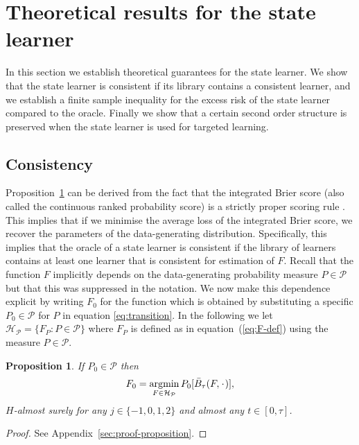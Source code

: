 \documentclass[numsec,webpdf,contemporary,medium,namedate]{oup-authoring-template}%
\theoremstyle{thmstyleone}%
\newtheorem{proposition}{Proposition}
\theoremstyle{thmstyletwo}%
\theoremstyle{thmstylethree}%
\DeclareMathOperator{\E}{\mathbb{E}} %
\newcommand{\blank}{\makebox[1ex]{\textbf{$\cdot$}}}
\renewcommand{\phi}{\varphi}
\newcommand{\1}{\mathds{1}}
\DeclareMathOperator*{\argmin}{\arg\!\min}
\begin{document}
\section{Theoretical results for the state learner}
\label{sec:theor-results-prop}

In this section we establish theoretical guarantees for the state learner. We
show that the state learner is consistent if its library contains a consistent
learner, and we establish a finite sample inequality for the excess risk of the
state learner compared to the oracle. Finally we show that a certain second
order structure is preserved when the state learner is used for targeted
learning.

\subsection{Consistency}
\label{sec:consistency}

Proposition~\ref{prop:stric-prop} can be derived from the fact that the
integrated Brier score (also called the continuous ranked probability score) is
a strictly proper scoring rule \citep{gneiting2007strictly}. This implies that
if we minimise the average loss of the integrated Brier score, we recover the
parameters of the data-generating distribution. Specifically, this implies that
the oracle of a state learner is consistent if the library of learners contains
at least one learner that is consistent for estimation of \( F \). Recall that
the function \(F\) implicitly depends on the data-generating probability measure
\(P\in\mathcal P\) but that this was suppressed in the notation. We now make
this dependence explicit by writing \(F_0\) for the function which is obtained
by substituting a specific \(P_0\in\mathcal{P}\) for \(P\) in equation
\eqref{eq:transition}. In the following we let
\( \mathcal{H}_{\mathcal{P}} = \{F_P : P \in \mathcal{P}\} \) where \( F_P \) is defined as in
equation~(\ref{eq:F-def}) using the measure \( P \in \mathcal{P} \).

\begin{proposition}
  \label{prop:stric-prop}
  If \(P_0\in\mathcal{P}\) then
  \begin{equation*}
    F_0 = \argmin_{F \in \mathcal{H}_{\mathcal{P}}} P_0{[\bar{B}_\tau(F, \blank)]},
  \end{equation*}
  \( H \)-almost surely for any \( j\in \{-1,0,1,2\} \) and almost any
  \( t \in [0, \tau]\).
\end{proposition}
\begin{proof}
  See Appendix~\ref{sec:proof-proposition}.
\end{proof}
\end{document}
